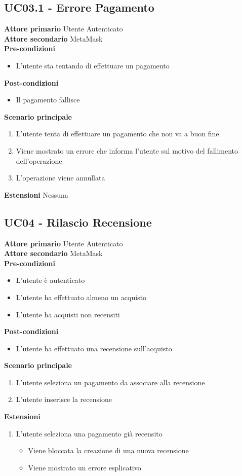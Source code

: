 \subsection{UC03.1 - Errore Pagamento}
\textbf{Attore primario} Utente Autenticato \\
\textbf{Attore secondario} MetaMask \\
\textbf{Pre-condizioni}
\begin{itemize}
    \item L'utente sta tentando di effettuare un pagamento
\end{itemize}
\textbf{Post-condizioni}
\begin{itemize}
    \item Il pagamento fallisce
\end{itemize}
\textbf{Scenario principale}
\begin{enumerate}
    \item L'utente tenta di effettuare un pagamento che non va a buon fine
    \item Viene mostrato un errore che informa l'utente sul motivo del fallimento
          dell'operazione
    \item L'operazione viene annullata
\end{enumerate}
\textbf{Estensioni} Nessuna

\subsection{UC04 - Rilascio Recensione}
\textbf{Attore primario} Utente Autenticato \\
\textbf{Attore secondario} MetaMask \\
\textbf{Pre-condizioni}
\begin{itemize}
    \item L'utente è autenticato
    \item L'utente ha effettuato almeno un acquisto
    \item L'utente ha acquisti non recensiti
\end{itemize}
\textbf{Post-condizioni}
\begin{itemize}
    \item L'utente ha effettuato una recensione sull'acquisto
\end{itemize}
\textbf{Scenario principale}
\begin{enumerate}
    \item L'utente seleziona un pagamento da associare alla recensione
    \item L'utente inserisce la recensione
\end{enumerate}
\textbf{Estensioni}
\begin{enumerate}
    \item L'utente seleziona una pagamento già recensito
          \begin{itemize}
              \item Viene bloccata la creazione di una nuova recensione
              \item Viene mostrato un errore esplicativo
          \end{itemize}
\end{enumerate}

